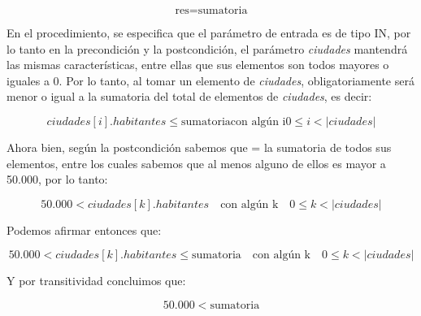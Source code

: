 \documentclass[10pt,a4paper]{article}
\begin{document}
\[
\text{res} = \text{sumatoria}  
\]

En el procedimiento, se especifica que el parámetro de entrada es de tipo IN, por lo tanto en la precondición y la postcondición, el parámetro \textit{ciudades} mantendrá las mismas características, entre ellas que sus elementos son todos mayores o iguales a 0. Por lo tanto, al tomar un elemento de \textit{ciudades}, obligatoriamente será menor o igual a la sumatoria del total de elementos de \textit{ciudades}, es decir:

\[
\textit{ciudades}[i].habitantes \leq \text{sumatoria} \text{con algún i} 0 \leq i < |\textit{ciudades}|
\]

Ahora bien, según la postcondición sabemos que  = la sumatoria de todos sus elementos, entre los cuales sabemos que al menos alguno de ellos es mayor a 50.000, por lo tanto:

\[
50.000 < \textit{ciudades}[k].habitantes \quad \text{con algún k} \quad 0 \leq k < |\textit{ciudades}|
\]

Podemos afirmar entonces que:

\[
50.000 < \textit{ciudades}[k].habitantes \leq \text{sumatoria} \quad \text{con algún k} \quad 0 \leq k < |\textit{ciudades}|
\]

Y por transitividad concluimos que:

\[
50.000 < \text{sumatoria}
\]
\end{document}
